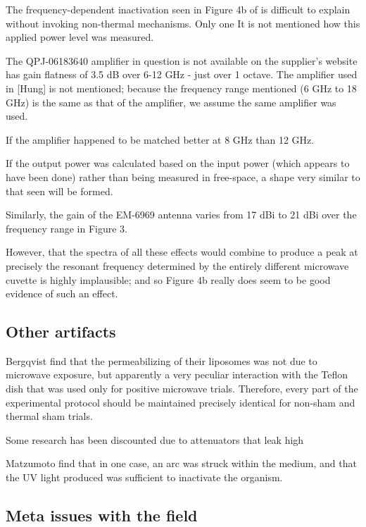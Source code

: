 \documentclass[paper.tex]{subfiles}
\begin{document}
\begin{multicols}{1}
\begin{quote}
\end{quote}

The frequency-dependent inactivation seen in Figure 4b of \cite{Efficient2015} is difficult to explain without invoking non-thermal mechanisms. Only one  It is not mentioned how this applied power level was measured. 

The QPJ-06183640 amplifier in question is not available on the supplier's website \cite{Microwaved} has gain flatness of 3.5 dB over 6-12 GHz - just over 1 octave. The amplifier used in [Hung] is not mentioned; because the frequency range mentioned (6 GHz to 18 GHz) is the same as that of the amplifier, we assume the same amplifier was used. 

If the amplifier happened to be matched better at 8 GHz than 12 GHz.

If the output power was calculated based on the input power (which appears to have been done) rather than being measured in free-space, a shape very similar to that seen will be formed.

Similarly, the gain of the EM-6969 antenna\cite{EM6969} varies from 17 dBi to 21 dBi over the frequency range in Figure 3.

However, that the spectra of all these effects would combine to produce a peak at precisely the resonant frequency determined by the entirely different microwave cuvette is highly implausible; and so Figure 4b really does seem to be good evidence of such an effect.


\subsection{Other artifacts}

Bergqvist \cite{Effect1994a} find that the permeabilizing of their liposomes was not due to microwave exposure, but apparently a very peculiar interaction with the Teflon dish that was used only for positive microwave trials. Therefore, every part of the experimental protocol should be maintained precisely identical for non-sham and thermal sham trials.

Some research has been discounted due to attenuators that leak high 

Matzumoto \cite{Inactivation1991} find that in one case, an arc was struck within the medium, and that the UV light produced was sufficient to inactivate the organism.


\subsection{Meta issues with the field}


\end{multicols}
\end{document}
